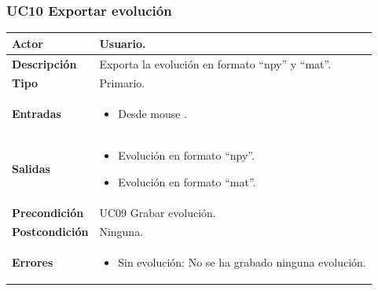 \subsubsection*{UC10 Exportar evolución}

\begin{table}[H]
	\begin{center}
		\begin{tabular}{| p{} | p{} |}
			\hline 
			\textbf{Actor} & Usuario. \\ \hline
			\textbf{Descripción} & Exporta la evolución en formato ``npy'' y ``mat''. \\ \hline
			\textbf{Tipo} & Primario. \\ \hline
			\textbf{Entradas} &
			\begin{itemize}[noitemsep, nosep]
				\item Desde mouse \BTN{exportar}.
			\end{itemize}
			\\ \hline
			\textbf{Salidas} & \begin{itemize}[noitemsep, nosep]
				\item Evolución en formato ``npy''.
				\item Evolución en formato ``mat''.
			\end{itemize} \\ \hline
			\textbf{Precondición} & UC09 Grabar evolución.
			\\ \hline
			\textbf{Postcondición} & Ninguna.  \\ \hline
			\textbf{Errores} & \begin{itemize}[noitemsep, nosep]
				\item Sin evolución: No se ha grabado ninguna evolución.
			\end{itemize}  \\ \hline
		\end{tabular}
	\end{center}
\end{table}

